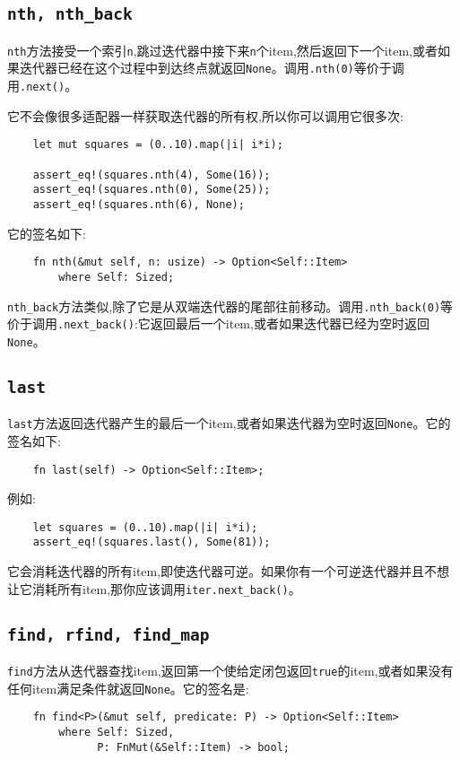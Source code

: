 \subsection{\texttt{nth, nth\_back}}
\texttt{nth}方法接受一个索引\texttt{n},跳过迭代器中接下来\texttt{n}个item,然后返回下一个item,或者如果迭代器已经在这个过程中到达终点就返回\texttt{None}。调用\texttt{.nth(0)}等价于调用\texttt{.next()}。

它不会像很多适配器一样获取迭代器的所有权,所以你可以调用它很多次:
\begin{verbatim}
    let mut squares = (0..10).map(|i| i*i);

    assert_eq!(squares.nth(4), Some(16));
    assert_eq!(squares.nth(0), Some(25));
    assert_eq!(squares.nth(6), None);
\end{verbatim}

它的签名如下:
\begin{verbatim}
    fn nth(&mut self, n: usize) -> Option<Self::Item>
        where Self: Sized;
\end{verbatim}

\texttt{nth\_back}方法类似,除了它是从双端迭代器的尾部往前移动。调用\texttt{.nth\_back(0)}等价于调用\texttt{.next\_back()}:它返回最后一个item,或者如果迭代器已经为空时返回\texttt{None}。

\subsection{\texttt{last}}
\texttt{last}方法返回迭代器产生的最后一个item,或者如果迭代器为空时返回\texttt{None}。它的签名如下:
\begin{verbatim}
    fn last(self) -> Option<Self::Item>;
\end{verbatim}

例如:
\begin{verbatim}
    let squares = (0..10).map(|i| i*i);
    assert_eq!(squares.last(), Some(81));
\end{verbatim}

它会消耗迭代器的所有item,即使迭代器可逆。如果你有一个可逆迭代器并且不想让它消耗所有item,那你应该调用\texttt{iter.next\_back()}。

\subsection{\texttt{find, rfind, find\_map}}
\texttt{find}方法从迭代器查找item,返回第一个使给定闭包返回\texttt{true}的item,或者如果没有任何item满足条件就返回\texttt{None}。它的签名是:
\begin{verbatim}
    fn find<P>(&mut self, predicate: P) -> Option<Self::Item>
        where Self: Sized,
              P: FnMut(&Self::Item) -> bool;
\end{verbatim}


